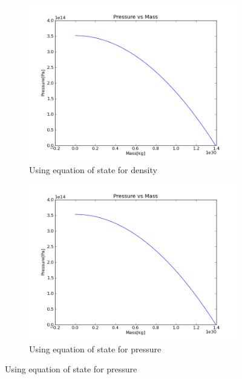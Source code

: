 \documentclass[a4paper,12pt]{article}
\begin{document}
\begin{figure}[H]
    \centering
    \begin{subfigure}{0.49\textwidth}
      \includegraphics[width=\textwidth]{Calculate_density/Pressure_for_rho_p_t_others_constant}
      \caption{Using equation of state for density}
      \label{fig:Pressure_density}
    \end{subfigure}
    \begin{subfigure}{0.49\textwidth}
      \includegraphics[width=\textwidth]{Calculate_pressure/Pressure_for_rho_p_t_others_constant}
      \caption{Using equation of state for pressure}
      \label{fig:Pressure_pressure}
    \end{subfigure}
\end{figure}
\end{document}
